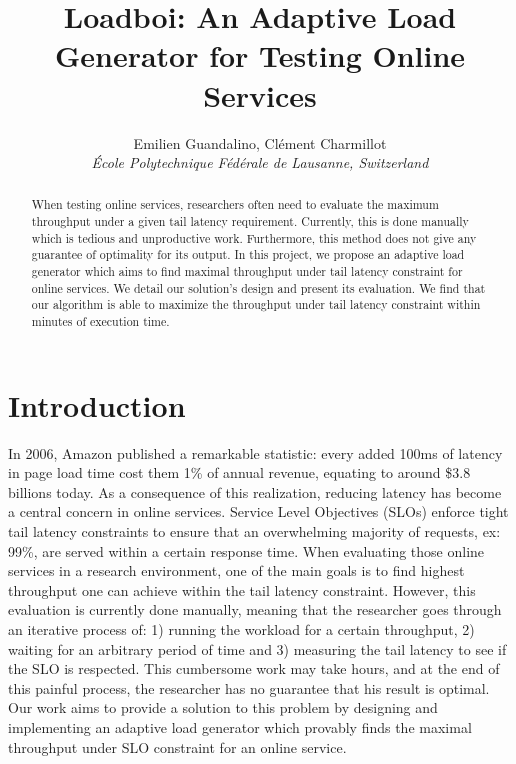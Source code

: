\documentclass[10pt,conference,compsocconf]{IEEEtran}
\begin{document}
\title{Loadboi: An Adaptive Load Generator for Testing Online Services}

\author{
  Emilien Guandalino, Clément Charmillot\\
  \textit{École Polytechnique Fédérale de Lausanne, Switzerland}
}

\maketitle

\begin{abstract}
	When testing online services, researchers often need to evaluate the maximum throughput under a given tail latency requirement. Currently, this is done manually which is tedious and unproductive work. Furthermore, this method does not give any guarantee of optimality for its output. In this project, we propose an adaptive load generator which aims to find maximal throughput under tail latency constraint for online services. We detail our solution's design and present its evaluation. We find that our algorithm is able to maximize the throughput under tail latency constraint within minutes of execution time.

\end{abstract}

\section{Introduction} \label{intro}

In 2006, Amazon published a remarkable statistic: every added 100ms of latency in page load time cost them 1\% of annual revenue, equating to around \$3.8 billions today. As a consequence of this realization, reducing latency has become a central concern in online services. Service Level Objectives (SLOs) enforce tight tail latency constraints to ensure that an overwhelming majority of requests, ex: 99\%, are served within a certain response time. When evaluating those online services in a research environment, one of the main goals is to find highest throughput one can achieve within the tail latency constraint. However, this evaluation is currently done manually, meaning that the researcher goes through an iterative process of: 1) running the workload for a certain throughput, 2) waiting for an arbitrary period of time and 3) measuring the tail latency to see if the SLO is respected. This cumbersome work may take hours, and at the end of this painful process, the researcher has no guarantee that his result is optimal. Our work aims to provide a solution to this problem by designing and implementing an adaptive load generator which provably finds the maximal throughput under SLO constraint for an online service.
\end{document}
